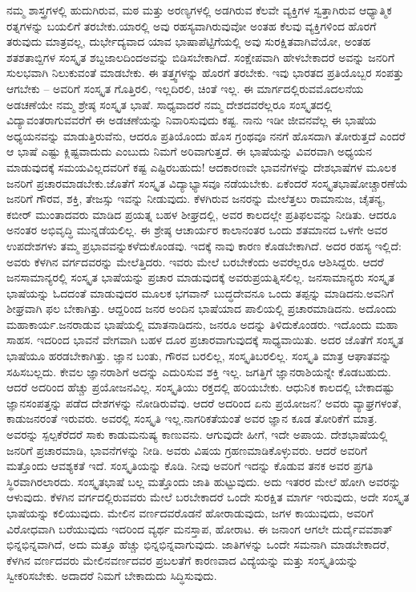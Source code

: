 ನಮ್ಮ ಶಾಸ್ತ್ರಗಳಲ್ಲಿ ಹುದುಗಿರುವ, ಮಠ ಮತ್ತು ಅರಣ್ಯಗಳಲ್ಲಿ ಅಡಗಿರುವ ಕೆಲವೇ ವ್ಯಕ್ತಿಗಳ ಸ್ವತ್ತಾಗಿರುವ ಆಧ್ಯಾತ್ಮಿಕ ರತ್ನಗಳನ್ನು ಬಯಲಿಗೆ ತರಬೇಕು.\break ಯಾರಲ್ಲಿ ಅವು ರಹಸ್ಯವಾಗಿರುವುವೋ ಅಂತಹ ಕೆಲವು ವ್ಯಕ್ತಿಗಳಿಂದ ಹೊರಗೆ ತರುವುದು ಮಾತ್ರವಲ್ಲ, ದುರ್ಭೇದ್ಯವಾದ ಯಾವ ಭಾಷಾಪೆಟ್ಟಿಗೆಯಲ್ಲಿ ಅವು ಸುರಕ್ಷಿತವಾಗಿವೆಯೋ, ಅಂತಹ ಶತಶತಾಬ್ದಿಗಳ ಸಂಸ್ಕೃತ ಶಬ್ದಜಾಲದಿಂದ\break ಅವನ್ನು ಬಿಡಿಸಬೇಕಾಗಿದೆ. ಸಂಕ್ಷೇಪವಾಗಿ ಹೇಳಬೇಕಾದರೆ ಅವನ್ನು ಜನರಿಗೆ ಸುಲಭವಾಗಿ ನಿಲುಕುವಂತೆ ಮಾಡಬೇಕು. ಈ ತತ್ತ್ವಗಳನ್ನು ಹೊರಗೆ ತರಬೇಕು. ಇವು ಭಾರತದ ಪ್ರತಿಯೊಬ್ಬರ ಸಂಪತ್ತು ಆಗಬೇಕು – ಅವರಿಗೆ ಸಂಸ್ಕೃತ ಗೊತ್ತಿರಲಿ, ಇಲ್ಲದಿರಲಿ, ಚಿಂತೆ ಇಲ್ಲ. ಈ ಮಾರ್ಗದಲ್ಲಿರುವ\break ಮೊದಲನೆಯ ಅಡಚಣೆಯೇ ನಮ್ಮ ಶ್ರೇಷ್ಠ ಸಂಸ್ಕೃತ ಭಾಷೆ. ಸಾಧ್ಯವಾದರೆ ನಮ್ಮ ದೇಶದವರೆಲ್ಲರೂ ಸಂಸ್ಕೃತದಲ್ಲಿ ವಿದ್ಯಾವಂತರಾಗುವವರೆಗೆ ಈ ಅಡಚಣೆಯನ್ನು ನಿವಾರಿಸುವುದು ಕಷ್ಟ. ನಾನು ಇಡೀ ಜೀವನವೆಲ್ಲ ಈ ಭಾಷೆಯ ಅಧ್ಯಯನವನ್ನು ಮಾಡುತ್ತಿರುವೆನು, ಆದರೂ ಪ್ರತಿಯೊಂದು ಹೊಸ ಗ್ರಂಥವೂ ನನಗೆ ಹೊಸದಾಗಿ ತೋರುತ್ತದೆ ಎಂದರೆ ಆ ಭಾಷೆ ಎಷ್ಟು ಕ್ಲಿಷ್ಟವಾದುದು ಎಂಬುದು ನಿಮಗೆ ಅರಿವಾಗುತ್ತದೆ. ಈ ಭಾಷೆಯನ್ನು ವಿವರವಾಗಿ ಅಧ್ಯಯನ ಮಾಡುವುದಕ್ಕೆ ಸಮಯವಿಲ್ಲದವರಿಗೆ ಕಷ್ಟ ಎಷ್ಟಿರಬಹುದು! ಆದಕಾರಣವೇ ಭಾವನೆಗಳನ್ನು ದೇಶಭಾಷೆಗಳ ಮೂಲಕ ಜನರಿಗೆ ಪ್ರಚಾರಮಾಡಬೇಕು.\break ಜೊತೆಗೆ ಸಂಸ್ಕೃತ ವಿದ್ಯಾಭ್ಯಾಸವೂ ನಡೆಯಬೇಕು. ಏಕೆಂದರೆ ಸಂಸ್ಕೃತಭಾಷೋಚ್ಚಾರಣೆಯೆ ಜನರಿಗೆ ಗೌರವ, ಶಕ್ತಿ, ತೇಜಸ್ಸು ಇವನ್ನು ನೀಡುವುದು. ಕೆಳಗಿರುವ ಜನರನ್ನು ಮೇಲೆತ್ತಲು ರಾಮಾನುಜ, ಚೈತನ್ಯ, ಕಬೀರ್​ ಮುಂತಾದವರು ಮಾಡಿದ ಪ್ರಯತ್ನ ಬಹಳ ಶೀಘ್ರದಲ್ಲಿ, ಅವರ ಕಾಲದಲ್ಲೇ ಪ್ರತಿಫಲವನ್ನು ನೀಡಿತು. ಆದರೂ ಅನಂತರ ಅಭಿವೃದ್ಧಿ ಮುನ್ನಡೆಯಲಿಲ್ಲ. ಈ ಶ್ರೇಷ್ಠ ಆಚಾರ್ಯರ ಕಾಲಾನಂತರ ಒಂದು ಶತಮಾನದ ಒಳಗೇ ಅವರ ಉಪದೇಶಗಳು ತಮ್ಮ ಪ್ರಭಾವವನ್ನುಕಳೆದುಕೊಂಡವು. ಇದಕ್ಕೆ ನಾವು ಕಾರಣ ಕೊಡಬೇಕಾಗಿದೆ. ಅದರ ರಹಸ್ಯ ಇಲ್ಲಿದೆ: ಅವರು ಕೆಳಗಿನ ವರ್ಗದವರನ್ನು ಮೇಲೆತ್ತಿ\-ದರು. ಇವರು ಮೇಲೆ ಬರಬೇಕೆಂದು ಅವರೆಲ್ಲರೂ ಆಶಿಸಿದ್ದರು. ಆದರೆ ಜನ\-ಸಾಮಾನ್ಯರಲ್ಲಿ ಸಂಸ್ಕೃತ ಭಾಷೆಯನ್ನು ಪ್ರಚಾರ ಮಾಡುವುದಕ್ಕೆ ಅವರು\break ಪ್ರಯತ್ನಿಸಲಿಲ್ಲ. ಜನಸಾಮಾನ್ಯರು ಸಂಸ್ಕೃತ ಭಾಷೆಯನ್ನು ಓದದಂತೆ ಮಾಡುವುದರ ಮೂಲಕ ಭಗವಾನ್​ ಬುದ್ಧದೇವನೂ ಒಂದು ತಪ್ಪನ್ನು ಮಾಡಿದನು.\break ಅವನಿಗೆ ಶೀಘ್ರವಾಗಿ ಫಲ ಬೇಕಾಗಿತ್ತು. ಆದ್ದರಿಂದ ಜನರ ಅಂದಿನ ಭಾಷೆಯಾದ ಪಾಲಿಯಲ್ಲಿ ಪ್ರಚಾರಮಾಡಿದನು. ಅದೊಂದು ಮಹಾಕಾರ್ಯ.\break ಜನರಾಡುವ ಭಾಷೆಯಲ್ಲಿ ಮಾತನಾಡಿದನು, ಜನರೂ ಅದನ್ನು ತಿಳಿದು\break ಕೊಂಡರು. ಇದೊಂದು ಮಹಾ ಸಾಹಸ. ಇದರಿಂದ ಭಾವನೆ ವೇಗವಾಗಿ ಬಹಳ ದೂರ ಪ್ರಚಾರವಾಗುವುದಕ್ಕೆ ಸಾಧ್ಯವಾಯಿತು. ಅದರ ಜೊತೆಗೆ ಸಂಸ್ಕೃತ ಭಾಷೆಯೂ ಹರಡಬೇಕಾಗಿತ್ತು. ಜ್ಞಾನ ಬಂತು, ಗೌರವ ಬರಲಿಲ್ಲ, ಸಂಸ್ಕೃತಿ\break ಬರಲಿಲ್ಲ. ಸಂಸ್ಕೃತಿ ಮಾತ್ರ ಆಘಾತವನ್ನು ಸಹಿಸಬಲ್ಲದು. ಕೇವಲ ಜ್ಞಾನರಾಶಿಗೆ ಅದನ್ನು ಎದುರಿಸುವ ಶಕ್ತಿ ಇಲ್ಲ. ಜಗತ್ತಿಗೆ ಜ್ಞಾನರಾಶಿಯನ್ನೇ ಕೊಡಬಹುದು. ಆದರೆ ಅದರಿಂದ ಹೆಚ್ಚು ಪ್ರಯೋಜನವಿಲ್ಲ. ಸಂಸ್ಕೃತಿಯು ರಕ್ತದಲ್ಲಿ ಹರಿಯಬೇಕು. ಆಧುನಿಕ ಕಾಲದಲ್ಲಿ ಬೇಕಾದಷ್ಟು ಜ್ಞಾನಸಂಪತ್ತನ್ನು ಪಡೆದ ದೇಶಗಳನ್ನು ನೋಡಿರುವೆವು. ಆದರೆ ಅದರಿಂದ ಏನು ಪ್ರಯೋಜನ? ಅವರು ವ್ಯಾಘ್ರಗಳಂತೆ, ಕಾಡುಜನರಂತೆ ಇರುವರು. ಅವರಲ್ಲಿ ಸಂಸ್ಕೃತಿ ಇಲ್ಲ.\break ನಾಗರಿಕತೆಯಂತೆ ಅವರ ಜ್ಞಾನ ಕೂಡ ತೋರಿಕೆಗೆ ಮಾತ್ರ. ಅವರನ್ನು ಸ್ಪಲ್ಪ\break ಕೆರೆದರೆ ಸಾಕು ಕಾಡುಮನುಷ್ಯ ಕಾಣುವನು. ಆಗುವುದೇ ಹೀಗೆ, ಇದೇ ಅಪಾಯ. ದೇಶಭಾಷೆಯಲ್ಲಿ ಜನರಿಗೆ ಪ್ರಚಾರಮಾಡಿ, ಭಾವನೆಗಳನ್ನು ನೀಡಿ. ಅವರು ವಿಷಯ ಗ್ರಹಣಮಾಡಿಕೊಳ್ಳುವರು. ಆದರೆ ಅವರಿಗೆ ಮತ್ತೊಂದು ಆವಶ್ಯಕತೆ ಇದೆ. ಸಂಸ್ಕೃತಿಯನ್ನು ಕೊಡಿ. ನೀವು ಅವರಿಗೆ ಇದನ್ನು ಕೊಡುವ ತನಕ ಅವರ ಪ್ರಗತಿ ಸ್ಥಿರವಾಗಿರಲಾರದು. ಸಂಸ್ಕೃತಭಾಷೆ ಬಲ್ಲ ಮತ್ತೊಂದು ಜಾತಿ ಹುಟ್ಟುವುದು. ಅದು ಇತರರ ಮೇಲೆ ಹೋಗಿ ಅವರನ್ನು ಆಳುವುದು. ಕೆಳಗಿನ ವರ್ಗದಲ್ಲಿರುವವರು ಮೇಲೆ ಬರಬೇಕಾದರೆ ಒಂದೇ ಸುರಕ್ಷಿತ ಮಾರ್ಗ ಇರುವುದು, ಅದೇ ಸಂಸ್ಕೃತ ಭಾಷೆಯನ್ನು ಕಲಿಯುವುದು. ಮೇಲಿನ ವರ್ಣದವರೊಡನೆ ಹೋರಾಡುವುದು, ಜಗಳ ಕಾಯುವುದು, ಅವರಿಗೆ ವಿರೋಧವಾಗಿ ಬರೆಯುವುದು ಇದರಿಂದ ವ್ಯರ್ಥ ಮನಸ್ತಾಪ, ಹೋರಾಟ. ಈ ಜನಾಂಗ ಆಗಲೇ ದುರ್ದೈವವಶಾತ್​ ಭಿನ್ನಭಿನ್ನವಾಗಿದೆ, ಅದು ಮತ್ತೂ ಹೆಚ್ಚು ಭಿನ್ನಭಿನ್ನವಾಗುವುದು. ಜಾತಿಗಳನ್ನು ಒಂದೇ ಸಮನಾಗಿ ಮಾಡಬೇಕಾದರೆ, ಕೆಳಗಿನ ವರ್ಣದವರು ಮೇಲಿನವರ್ಣದವರ ಪ್ರಬಲತೆಗೆ ಕಾರಣವಾದ ವಿದ್ಯೆಯನ್ನು ಮತ್ತು ಸಂಸ್ಕೃತಿಯನ್ನು ಸ್ವೀಕರಿಸಬೇಕು. ಅದಾದರೆ ನಿಮಗೆ ಬೇಕಾದುದು ಸಿದ್ಧಿಸುವುದು.

